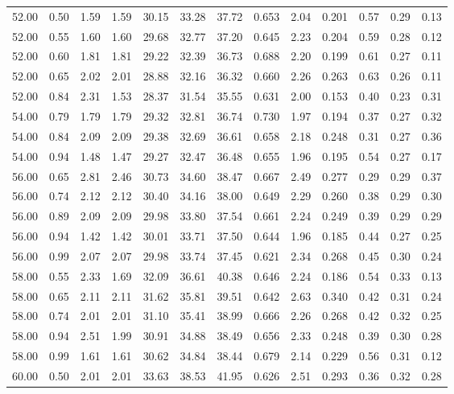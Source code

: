 \begin{longtable}{lc|cccc|cc|cc|ccc}
\hline
52.00 & 0.50 & 1.59 & 1.59 & 30.15 & 33.28 & 37.72 & 0.653 & 2.04 & 0.201 & 0.57 & 0.29 & 0.13\\
52.00 & 0.55 & 1.60 & 1.60 & 29.68 & 32.77 & 37.20 & 0.645 & 2.23 & 0.204 & 0.59 & 0.28 & 0.12\\
52.00 & 0.60 & 1.81 & 1.81 & 29.22 & 32.39 & 36.73 & 0.688 & 2.20 & 0.199 & 0.61 & 0.27 & 0.11\\
52.00 & 0.65 & 2.02 & 2.01 & 28.88 & 32.16 & 36.32 & 0.660 & 2.26 & 0.263 & 0.63 & 0.26 & 0.11\\
52.00 & 0.84 & 2.31 & 1.53 & 28.37 & 31.54 & 35.55 & 0.631 & 2.00 & 0.153 & 0.40 & 0.23 & 0.31\\
\hline
54.00 & 0.79 & 1.79 & 1.79 & 29.32 & 32.81 & 36.74 & 0.730 & 1.97 & 0.194 & 0.37 & 0.27 & 0.32\\
54.00 & 0.84 & 2.09 & 2.09 & 29.38 & 32.69 & 36.61 & 0.658 & 2.18 & 0.248 & 0.31 & 0.27 & 0.36\\
54.00 & 0.94 & 1.48 & 1.47 & 29.27 & 32.47 & 36.48 & 0.655 & 1.96 & 0.195 & 0.54 & 0.27 & 0.17\\
\hline
56.00 & 0.65 & 2.81 & 2.46 & 30.73 & 34.60 & 38.47 & 0.667 & 2.49 & 0.277 & 0.29 & 0.29 & 0.37\\
56.00 & 0.74 & 2.12 & 2.12 & 30.40 & 34.16 & 38.00 & 0.649 & 2.29 & 0.260 & 0.38 & 0.29 & 0.30\\
56.00 & 0.89 & 2.09 & 2.09 & 29.98 & 33.80 & 37.54 & 0.661 & 2.24 & 0.249 & 0.39 & 0.29 & 0.29\\
56.00 & 0.94 & 1.42 & 1.42 & 30.01 & 33.71 & 37.50 & 0.644 & 1.96 & 0.185 & 0.44 & 0.27 & 0.25\\
56.00 & 0.99 & 2.07 & 2.07 & 29.98 & 33.74 & 37.45 & 0.621 & 2.34 & 0.268 & 0.45 & 0.30 & 0.24\\
\hline
58.00 & 0.55 & 2.33 & 1.69 & 32.09 & 36.61 & 40.38 & 0.646 & 2.24 & 0.186 & 0.54 & 0.33 & 0.13\\
58.00 & 0.65 & 2.11 & 2.11 & 31.62 & 35.81 & 39.51 & 0.642 & 2.63 & 0.340 & 0.42 & 0.31 & 0.24\\
58.00 & 0.74 & 2.01 & 2.01 & 31.10 & 35.41 & 38.99 & 0.666 & 2.26 & 0.268 & 0.42 & 0.32 & 0.25\\
58.00 & 0.94 & 2.51 & 1.99 & 30.91 & 34.88 & 38.49 & 0.656 & 2.33 & 0.248 & 0.39 & 0.30 & 0.28\\
58.00 & 0.99 & 1.61 & 1.61 & 30.62 & 34.84 & 38.44 & 0.679 & 2.14 & 0.229 & 0.56 & 0.31 & 0.12\\
\hline
60.00 & 0.50 & 2.01 & 2.01 & 33.63 & 38.53 & 41.95 & 0.626 & 2.51 & 0.293 & 0.36 & 0.32 & 0.28\\

\end{longtable}
